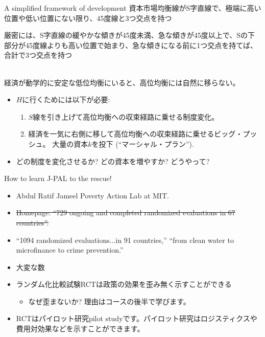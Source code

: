 \begin{frame}[label = changeequilibria]{A simplified framework of development}
資本市場均衡線がS字直線で、極端に高い位置や低い位置にない限り、45度線と3つ交点を持つ
\begin{dinglist}{43}
\vspace{1.0ex}\setlength{\itemsep}{1.0ex}\setlength{\baselineskip}{12pt}
\pause
\item	厳密には、S字直線の緩やかな傾きが45度未満、急な傾きが45度以上で、Sの下部分が45度線よりも高い位置で始まり、急な傾きになる前に1つ交点を持てば、合計で3つ交点を持つ\\~\\
\end{dinglist}
\pause
経済が動学的に安定な低位均衡にいると、高位均衡には自然に移らない。
\begin{itemize}[<+->]
\vspace{1.0ex}\setlength{\itemsep}{3.0ex}\setlength{\baselineskip}{12pt}
\item	$H$に行くためには以下が必要:
	\begin{enumerate}[<+->]
	\vspace{1.0ex}\setlength{\itemsep}{1.0ex}\setlength{\baselineskip}{12pt}
	\item	 $S$線を引き上げて高位均衡への収束経路に乗せる制度変化。
\hfill\hyperlink{shiftedS<1>}{}\\
	\item	経済を一気に右側に移して高位均衡への収束経路に乗せるビッグ・プッシュ。 大量の資本$k$を投下 (``マーシャル・プラン''). 
\hfill\hyperlink{PovTrapFig<22>}{}
	\end{enumerate}
\item	どの制度を変化させるか? どの資本を増やすか? どうやって?
\end{itemize}
\end{frame}


\begin{frame}{How to learn}
J-PAL to the rescue!
\begin{itemize}[<+->]
\vspace{1.0ex}\setlength{\itemsep}{1.0ex}\setlength{\baselineskip}{12pt}
\item	Abdul Ratif Jameel Poverty Action Lab at MIT.
\item	\sout{Homepage: ``729 ongoing and completed randomized evaluations in 67 countries''.}
\item	``1094 randomized evaluations...in 91 countries,'' ``from clean water to microfinance to crime prevention.'' 
\item	大変な数
\item	ランダム化比較試験RCTは政策の効果を歪み無く示すことができる
	\begin{itemize}
	\vspace{1.0ex}\setlength{\itemsep}{1.0ex}\setlength{\baselineskip}{12pt}
	\item	なぜ歪まないか? 理由はコースの後半で学びます。
	\end{itemize}
\item	RCTはパイロット研究pilot studyです。パイロット研究はロジスティクスや費用対効果などを示すことができます。
\end{itemize}
\end{frame}

